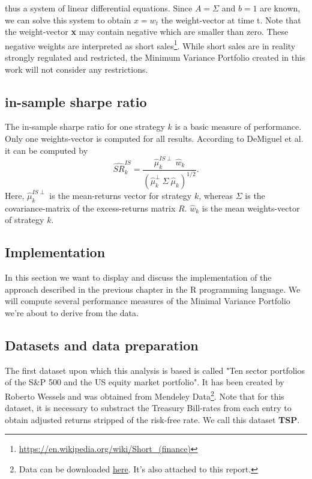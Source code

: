 thus a system of linear differential equations. Since $A = \Sigma$ and $b = 1$ are known, we can solve this system to obtain $x = w_t$ the weight-vector at time t. Note that the weight-vector \textbf{x} may contain negative which are smaller than zero. These negative weights are interpreted as short sales\footnote{\url{https://en.wikipedia.org/wiki/Short_(finance)}}. While short sales are in reality strongly regulated and restricted, the Minimum Variance Portfolio created in this work will not consider any restrictions.

\subsection{in-sample sharpe ratio}
The in-sample sharpe ratio for one strategy $k$ is a basic measure of performance. Only one weights-vector is computed for all results. According to DeMiguel et al. \cite[p. 1928]{DEM09} it can be computed by
\begin{equation} \label{eq:10}
\widehat{SR}^{IS}_{k} = \frac{\hat{\mu}^{IS\perp}_{k}~\hat{w}_k}{\left( \hat{\mu}_k^{\perp}~\Sigma~\hat{\mu}_k\right)^{1/2}}.
\end{equation}
Here, $\hat{\mu}^{IS\perp}_{k}$ is the mean-returns vector for strategy $k$, whereas $\Sigma$ is the covariance-matrix of the excess-returns matrix $R$. $\hat{w}_k$ is the mean weights-vector of strategy $k$.

\subsection{Implementation}
In this section we want to display and discuss the implementation of the approach described in the previous chapter in the R programming language. We will compute several performance measures of the Minimal Variance Portfolio we're about to derive from the data.

\subsection{Datasets and data preparation}
The first dataset upon which this analysis is based is called "Ten sector portfolios of the S\&P 500 and the US equity market portfolio". It has been created by Roberto Wessels and was obtained from Mendeley Data\footnote{Data can be downloaded \href{https://data.mendeley.com/datasets/ndxfrshm74/3}{here}. It's also attached to this report.}. Note that for this dataset, it is necessary to substract the Treasury Bill-rates from each entry to obtain adjusted returns stripped of the risk-free rate. We call this dataset \textbf{TSP}.\\


